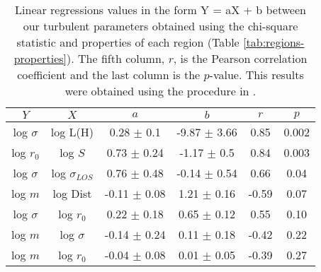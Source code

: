 \begin{table*}
\begin{center}
\caption{Linear regressions values in the form Y = aX + b between our turbulent parameters obtained using the chi-square statistic and properties of each region (Table \ref{tab:regions-properties}). The fifth column, $r$, is the Pearson correlation coefficient and the last column is the $p$-value. This results were obtained using the procedure in \citet{2007ApJ...665.1489K}.}
\begin{tabular}{cccccc}
\hline
            $Y$ &                   $X$ &                 $a$ &                 $b$ &       $r$ &      $p$ \\
\hline
 log $\sigma$ &            log L(H) &   0.28 $\pm$ 0.1 &  -9.87 $\pm$ 3.66 &   0.85 &  0.002 \\
    log $r_0$ &             log $S$ &   0.73 $\pm$ 0.24 &  -1.17 $\pm$ 0.5 &   0.84 &  0.003 \\
 log $\sigma$ &  log $\sigma_{LOS}$ &   0.76 $\pm$ 0.48 &  -0.14 $\pm$ 0.54 &   0.66 &   0.04 \\
      log $m$ &            log Dist &  -0.11 $\pm$ 0.08 &   1.21 $\pm$ 0.16 &  -0.59 &   0.07 \\
 log $\sigma$ &         log $r_{0}$ &   0.22 $\pm$ 0.18 &   0.65 $\pm$ 0.12 &   0.55 &  0.10 \\
      log $m$ &        log $\sigma$ &  -0.14 $\pm$ 0.24 &   0.11 $\pm$ 0.18 &  -0.42 &  0.22 \\
      log $m$ &         log $r_{0}$ &  -0.04 $\pm$ 0.08 &   0.01 $\pm$ 0.05 &  -0.39 &   0.27 \\
\bottomrule
\end{tabular}\label{tab:RestStats}
\end{center}
\end{table*}


